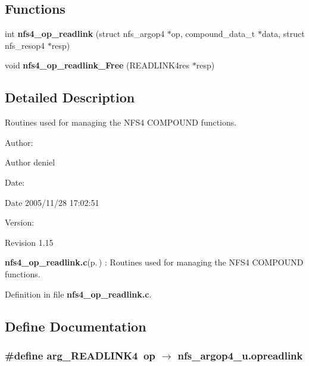 \subsection*{Functions}
\begin{CompactItemize}
\item 
int {\bf nfs4\_\-op\_\-readlink} (struct nfs\_\-argop4 $\ast$op, compound\_\-data\_\-t $\ast$data, struct nfs\_\-resop4 $\ast$resp)
\item 
void {\bf nfs4\_\-op\_\-readlink\_\-Free} (READLINK4res $\ast$resp)
\end{CompactItemize}


\subsection{Detailed Description}
Routines used for managing the NFS4 COMPOUND functions. 

\begin{Desc}
\item[Author:]\begin{Desc}
\item[Author]deniel \end{Desc}
\end{Desc}
\begin{Desc}
\item[Date:]\begin{Desc}
\item[Date]2005/11/28 17:02:51 \end{Desc}
\end{Desc}
\begin{Desc}
\item[Version:]\begin{Desc}
\item[Revision]1.15 \end{Desc}
\end{Desc}
{\bf nfs4\_\-op\_\-readlink.c}{\rm (p.\,\pageref{nfs4__op__readlink_8c})} : Routines used for managing the NFS4 COMPOUND functions.

Definition in file {\bf nfs4\_\-op\_\-readlink.c}.

\subsection{Define Documentation}
\subsubsection{\setlength{\rightskip}{0pt plus 5cm}\#define arg\_\-READLINK4\ op $\rightarrow$ nfs\_\-argop4\_\-u.opreadlink}\label{nfs4__op__readlink_8c_a0}


